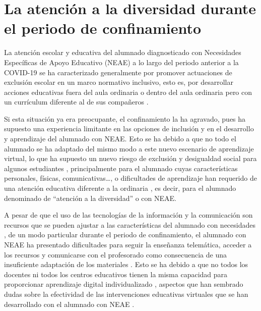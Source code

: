 \documentclass{textolivre}
\begin{document}
\section{La atención a la diversidad durante el periodo de confinamiento}
La atención escolar y educativa del alumnado diagnosticado con Necesidades Específicas de Apoyo Educativo (NEAE) a lo largo del periodo anterior a la COVID-19 se ha caracterizado generalmente por promover actuaciones de exclusión escolar en un marco normativo inclusivo, esto es, por desarrollar acciones educativas fuera del aula ordinaria \cite{gonzalescortesmanas2020, manasgonzalescortes2020, morina2010} %
o dentro del aula ordinaria pero con un currículum diferente al de sus compañeros \cite{arnaiz2011}. %

Si esta situación ya era preocupante, el confinamiento la ha agravado, pues ha supuesto una experiencia limitante en las opciones de inclusión y en el desarrollo y aprendizaje del alumnado con NEAE. Esto se ha debido a que no todo el alumnado se ha adaptado del mismo modo a este nuevo escenario de aprendizaje virtual, lo que ha supuesto un nuevo riesgo de exclusión y desigualdad social para algunos estudiantes \cite{cabrera2020, echeita2020}, %
principalmente para el alumnado cuyas características personales, físicas, comunicativas…, o dificultades de aprendizaje han requerido de una atención educativa diferente a la ordinaria \cite{menendez2020}, %
es decir, para el alumnado denominado de “atención a la diversidad” \cite{agredamontoro2016} %
o con NEAE.

A pesar de que el uso de las tecnologías de la información y la comunicación son recursos que se pueden ajustar a las características del alumnado con necesidades \cite{campossoto2017}, %
de un modo particular durante el periodo de confinamiento, el alumnado con NEAE ha presentado dificultades para seguir la enseñanza telemática, acceder a los recursos y comunicarse con el profesorado como consecuencia de una insuficiente adaptación de los materiales \cite{berastegui2020}. %
Esto se ha debido a que no todos los docentes ni todos los centros educativos tienen la misma capacidad para proporcionar aprendizaje digital individualizado \cite{rogero2020}, %
aspectos que han sembrado dudas sobre la efectividad de las intervenciones educativas virtuales que se han desarrollado con el alumnado con NEAE \cite{menendez2020}. %
\end{document}
